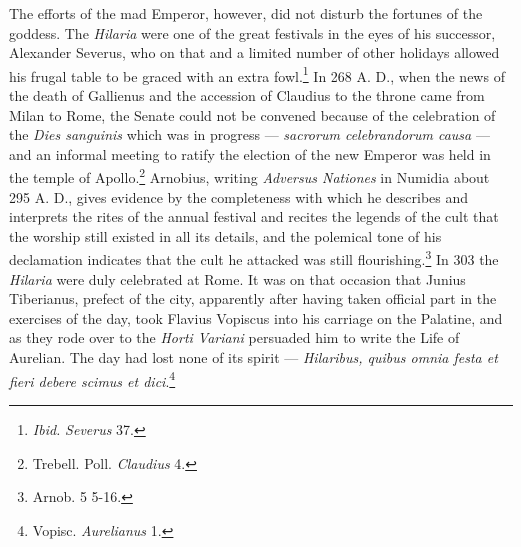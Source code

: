 \documentclass[a4paper, 11pt, oneside, polutonikogreek, english]{article}
\begin{document}
The efforts of the mad Emperor, however, did not disturb the fortunes of the goddess. The \emph{Hilaria} were one of the great festivals in the eyes of his successor, Alexander Severus, who on that and a limited number of other holidays allowed his frugal table to be graced with an extra fowl.\footnote{\emph{Ibid.} \emph{Severus} 37.} In 268 A. D., when the news of the death of Gallienus and the accession of Claudius to the throne came from Milan to Rome, the Senate could not be convened because of the celebration of the \emph{Dies sanguinis} which was in progress --- \emph{sacrorum celebrandorum causa} --- and an informal meeting to ratify the election of the new Emperor was held in the temple of Apollo.\footnote{Trebell. Poll. \emph{Claudius} 4.} Arnobius, writing \emph{Adversus Nationes} in Numidia about 295 A. D., gives evidence by the completeness with which he describes and interprets the rites of the annual festival and recites the legends of the cult that the worship still existed in all its details, and the polemical tone of his declamation indicates that the cult he attacked was still flourishing.\footnote{Arnob. 5 5-16.} In 303 the \emph{Hilaria} were duly celebrated at Rome. It was on that occasion that Junius Tiberianus, prefect of the city, apparently after having taken official part in the exercises of the day, took Flavius Vopiscus into his carriage on the Palatine, and as they rode over to the \emph{Horti Variani} persuaded him to write the Life of Aurelian. The day had lost none of its spirit --- \emph{Hilaribus, quibus omnia festa et fieri debere scimus et dici}.\footnote{Vopisc. \emph{Aurelianus} 1.}
\end{document}
